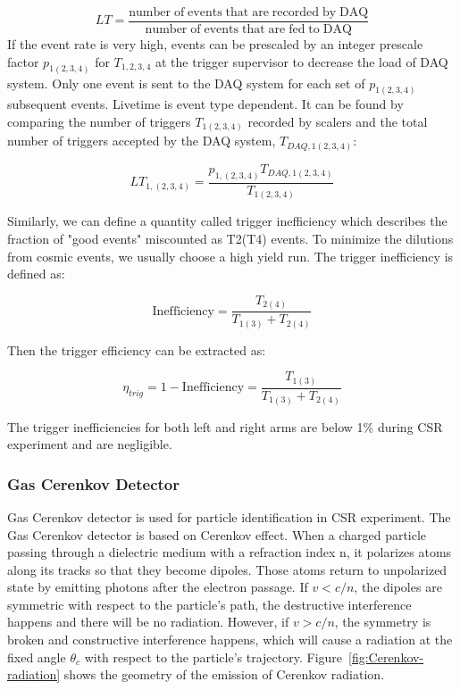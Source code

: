 \begin{equation} \label{LT_def}
LT = \frac{\mathrm{number \; of \; events \; that \; are \; recorded \; by \; DAQ}}{\mathrm{number \; of \; events \; that \; are \; fed
\; to \; DAQ}}
\end{equation}
If the event rate is very high, events can be prescaled by an integer prescale factor $p_{1(2,3,4)}$ for $T_{1,2,3,4}$ at the trigger supervisor to decrease the
load of DAQ system. Only one event is sent to the DAQ system for each set of $p_{1(2,3,4)}$ subsequent events.
Livetime is event type dependent. It can be found by comparing the number of triggers $T_{1(2,3,4)}$ recorded by scalers
and the total number of triggers accepted by the DAQ system, $T_{DAQ,1(2,3,4)}$:

\begin{equation}
LT_{1,(2,3,4)} = \frac{p_{1,(2,3,4)}T_{DAQ,1(2,3,4)}}{T_{1(2,3,4)}}
\end{equation}  

Similarly, we can define a quantity called trigger inefficiency which describes the fraction of 
"good events" miscounted as T2(T4) events.
To minimize the dilutions from cosmic events, we usually choose a high yield run.
The trigger inefficiency is defined as:

\begin{equation}
\mathrm{Inefficiency} = \frac{T_{2(4)}}{T_{1(3)} + T_{2(4)}}
\end{equation}  

Then the trigger efficiency can be extracted as:

\begin{equation}
\eta_{trig} = 1 - \mathrm{Inefficiency} =  \frac{T_{1(3)}}{T_{1(3)} + T_{2(4)}}
\end{equation}  

The trigger inefficiencies for both left and right arms are below 1\% during CSR experiment
and are negligible.


\subsubsection{Gas Cerenkov Detector}
Gas Cerenkov detector is used for particle identification in CSR experiment.
The Gas Cerenkov detector is based on Cerenkov effect.
When a charged particle passing through a dielectric medium with a refraction index n, it polarizes atoms
along its tracks so that they become dipoles. Those atoms return to unpolarized state by emitting photons
after the electron passage. If $v < c/n$, the dipoles are symmetric with respect to the particle's path,
the destructive interference happens and there will be no radiation. However, if $v > c/n$, the symmetry is broken
and constructive interference happens, which will cause a radiation at the fixed angle $\theta_c$ with respect to the particle's trajectory.  
Figure~\ref{fig:Cerenkov-radiation} shows the geometry of the emission of Cerenkov radiation.

